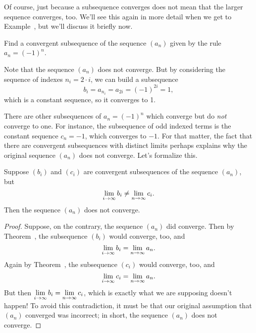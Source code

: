 Of course, just because a subsequence converges does not mean that the
larger sequence converges, too.  We'll see this again in more detail
when we get to Example~, but we'll
discuss it briefly now.

\begin{example}
Find a convergent subsequence of the sequence $(a_n)$ given by the rule $a_n = (-1)^n$.
\end{example}

\begin{solution}
Note that the sequence $(a_n)$ does not converge.  But by considering the sequence of indexes $n_i = 2 \cdot i$, we can build a subsequence
$$
b_i = a_{n_i} = a_{2i} = (-1)^{2i} = 1,
$$
which is a constant sequence, so it converges to 1.
\end{solution}

There are other subsequences of $a_n = (-1)^n$ which converge but do
\textit{not} converge to one.  For instance, the subsequence of odd
indexed terms is the constant sequence $c_n = -1$, which converges to
$-1$.  For that matter, the fact that there are convergent
subsequences with distinct limits perhaps explains why the original
sequence $(a_n)$ does not converge.  Let's formalize this.

\begin{corollary}
  \label{corollary:different-subsequences-then-diverge}

  Suppose $(b_i)$ and $(c_i)$ are convergent subsequences of the sequence $(a_n)$, but
  $$
  \displaystyle\lim_{i \to \infty} b_i \neq \displaystyle\lim_{n \to \infty} c_i.
  $$
  Then the sequence $(a_n)$ does not converge.
\end{corollary}

\begin{proof}
  Suppose, on the contrary, the sequence $(a_n)$ did converge.  Then by
  Theorem~, the subsequence
  $(b_i)$ would converge, too, and
  $$
  \displaystyle\lim_{i \to \infty} b_i = \displaystyle\lim_{n \to \infty} a_n.
  $$
  Again by Theorem~, the subsequence
  $(c_i)$ would converge, too, and
  $$
  \displaystyle\lim_{i \to \infty} c_i = \displaystyle\lim_{n \to \infty} a_n.
  $$
  But then $\displaystyle\lim_{i \to \infty} b_i = \displaystyle\lim_{n \to \infty} c_i$,
  which is exactly what we are supposing doesn't happen!  To avoid
  this contradiction, it must be that our original assumption that
  $(a_n)$ converged was incorrect; in short, the sequence $(a_n)$ does
  not converge.
\end{proof}

